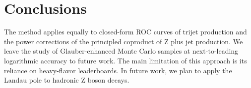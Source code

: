 \section{Conclusions}\label{sec:conclusions}

The method applies equally to closed-form ROC curves of trijet
production and the power corrections of the principled coproduct of Z
plus jet production. We leave the study of Glauber-enhanced Monte Carlo
samples at next-to-leading logarithmic accuracy to future work. The main
limitation of this approach is its reliance on heavy-flavor
leaderboards. In future work, we plan to apply the Landau pole to
hadronic Z boson decays.

